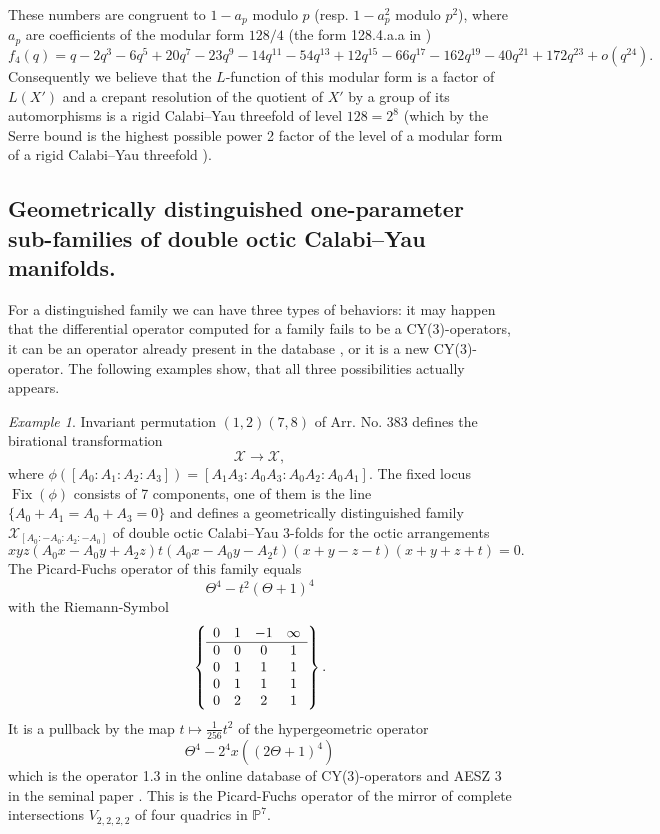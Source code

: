 \documentclass[12pt]{amsart}
\theoremstyle{plain}
\theoremstyle{remark}
\newtheorem{exmp}{Example}
\theoremstyle{definition}
\newcommand{\PP}{\mathbb P}
\newcommand{\lra}{\longrightarrow}
\numberwithin{table}{section}
\begin{document}
These numbers are congruent to $1-a_{p}$ modulo $p$ (resp. $1-a_{p}^{2}$ modulo $p^{2}$), where $a_{p}$ are coefficients of the modular form $128/4$ (the form 128.4.a.a in \cite{LMFDB})
\[f_{4}(q)=q - 2  q^3 - 6  q^5 + 20  q^7 - 23  q^9 - 14  q^{11} - 54  q^{13} + 12  q^{15} - 66  q^{17} - 162  q^{19} - 40  q^{21} + 172  q^{23} + o(q^{24}).
\]
Consequently we believe that the $L$-function of this modular form is a factor of $L(X')$ and a crepant resolution of the quotient of $X'$ by a group of its automorphisms is a rigid Calabi--Yau threefold of level $128=2^{8}$ (which by the Serre bound is the highest possible power 2 factor of the level of a modular form of a rigid Calabi--Yau threefold \cite{Serre}).




\subsection{Geometrically distinguished one-parameter sub-families of double octic Calabi--Yau manifolds.}
For a distinguished family we can have three types of behaviors: it may happen that the differential operator computed for a family fails to be a CY(3)-operators, it can be an operator already present in the database \cite{CYDB}, or it is a new CY(3)-operator. The following examples show, that all three possibilities actually appears.
\begin{exmp}
	Invariant permutation $(1,2)(7,8)$ of Arr. No. 383 defines the birational transformation
	\[ \mathcal X \lra \mathcal X, \]
	where $\phi([A_{0}:A_{1}:A_{2}:A_{3}]) = [A_{1}A_{3}:A_{0}A_{3}:A_{0}A_{2}:A_{0}A_{1}]$.
	The fixed locus $\operatorname{Fix}(\phi)$ consists of 7 components, one of them is the line $\{A_{0}+A_{1}=A_{0}+A_{3}=0\}$ and defines a geometrically distinguished family
	\(\mathcal X_{[A_{0}:-A_{0}:A_{2}:-A_{0}]} \) of double octic Calabi--Yau 3-folds
	 for the octic arrangements
	 \[xyz(A_{0}x-A_{0}y+A_{2}z)t(A_{0}x-A_{0}y-A_{2}t)(x+y-z-t)(x+y+z+t)=0.\]
	 The Picard-Fuchs operator of this family equals
	 \[\Theta^{4}-t^{2}(\Theta+1)^{4}\]
	 with the Riemann-Symbol
	 \[\left\{\begin{array}{*{4}c}
	 	0& 1& -1& \infty \\
	 	\hline0 & 0 & 0 & 1 \\
	 	0 & 1 & 1 & 1 \\
	 	0 & 1 & 1 & 1 \\
	 	0 & 2 & 2 & 1 \\
	 \end{array}\right\}.\]
	 It is a pullback by the map $t\mapsto \frac{1}{256}t^{2}$ of the hypergeometric operator
	 \[\Theta^4-2^{4} x\left((2\Theta+1)^4\right)\]
	 which is the operator 1.3 in the online database of CY(3)-operators \cite{CYDB} and
	 AESZ 3 in the seminal paper \cite{AESZ}. This is the Picard-Fuchs operator of the mirror of complete intersections $V_{2,2,2,2}$ of four quadrics in $\PP^{7}$.
\end{exmp}
\end{document}
